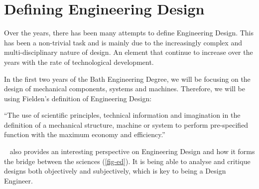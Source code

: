 \section{Defining Engineering Design}

Over the years, there has been many attempts to define Engineering Design. 
This has been a non-trivial task and is mainly due to the increasingly complex and multi-disciplinary nature of design. 
An element that continue to increase over the years with the rate of technological development.

In the first two years of the Bath Engineering Degree, we will be focusing on the design of mechanical components, systems and machines. 
Therefore, we will be using Fielden's definition of Engineering Design:

\begin{center}
  ``The use of scientific principles, technical information and imagination in the definition of a mechanical structure, machine or system to perform pre-specified function with the maximum economy and efficiency.''~\cite{fielden1963}
\end{center}

\citeauthor{pahl2013}~\cite{pahl2013} also provides an interesting perspective on Engineering Design and how it forms the bridge between the sciences (\cref{fig-ed}). It is being able to analyse and critique designs both objectively and subjectively, which is key to being a Design Engineer.


